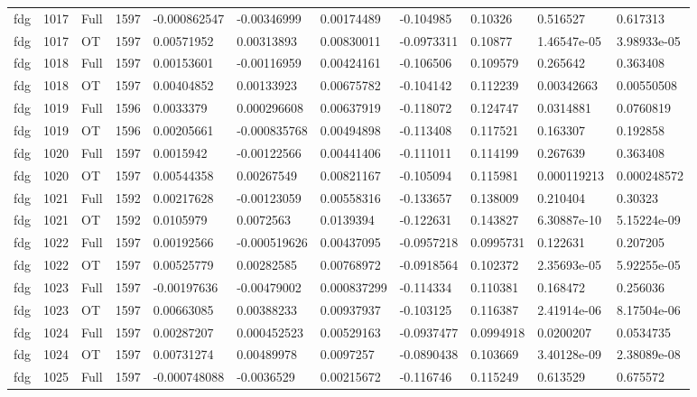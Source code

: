 \begin{landscape}
\begin{longtable}{lllllllllll}
fdg & 1017 & Full & 1597 & -0.000862547 & -0.00346999 & 0.00174489 & -0.104985 & 0.10326 & 0.516527 & 0.617313 \\
fdg & 1017 & OT & 1597 & 0.00571952 & 0.00313893 & 0.00830011 & -0.0973311 & 0.10877 & 1.46547e-05 & 3.98933e-05 \\
fdg & 1018 & Full & 1597 & 0.00153601 & -0.00116959 & 0.00424161 & -0.106506 & 0.109579 & 0.265642 & 0.363408 \\
fdg & 1018 & OT & 1597 & 0.00404852 & 0.00133923 & 0.00675782 & -0.104142 & 0.112239 & 0.00342663 & 0.00550508 \\
fdg & 1019 & Full & 1596 & 0.0033379 & 0.000296608 & 0.00637919 & -0.118072 & 0.124747 & 0.0314881 & 0.0760819 \\
fdg & 1019 & OT & 1596 & 0.00205661 & -0.000835768 & 0.00494898 & -0.113408 & 0.117521 & 0.163307 & 0.192858 \\
fdg & 1020 & Full & 1597 & 0.0015942 & -0.00122566 & 0.00441406 & -0.111011 & 0.114199 & 0.267639 & 0.363408 \\
fdg & 1020 & OT & 1597 & 0.00544358 & 0.00267549 & 0.00821167 & -0.105094 & 0.115981 & 0.000119213 & 0.000248572 \\
fdg & 1021 & Full & 1592 & 0.00217628 & -0.00123059 & 0.00558316 & -0.133657 & 0.138009 & 0.210404 & 0.30323 \\
fdg & 1021 & OT & 1592 & 0.0105979 & 0.0072563 & 0.0139394 & -0.122631 & 0.143827 & 6.30887e-10 & 5.15224e-09 \\
fdg & 1022 & Full & 1597 & 0.00192566 & -0.000519626 & 0.00437095 & -0.0957218 & 0.0995731 & 0.122631 & 0.207205 \\
fdg & 1022 & OT & 1597 & 0.00525779 & 0.00282585 & 0.00768972 & -0.0918564 & 0.102372 & 2.35693e-05 & 5.92255e-05 \\
fdg & 1023 & Full & 1597 & -0.00197636 & -0.00479002 & 0.000837299 & -0.114334 & 0.110381 & 0.168472 & 0.256036 \\
fdg & 1023 & OT & 1597 & 0.00663085 & 0.00388233 & 0.00937937 & -0.103125 & 0.116387 & 2.41914e-06 & 8.17504e-06 \\
fdg & 1024 & Full & 1597 & 0.00287207 & 0.000452523 & 0.00529163 & -0.0937477 & 0.0994918 & 0.0200207 & 0.0534735 \\
fdg & 1024 & OT & 1597 & 0.00731274 & 0.00489978 & 0.0097257 & -0.0890438 & 0.103669 & 3.40128e-09 & 2.38089e-08 \\
fdg & 1025 & Full & 1597 & -0.000748088 & -0.0036529 & 0.00215672 & -0.116746 & 0.115249 & 0.613529 & 0.675572 \\

\end{longtable}
\end{landscape}
